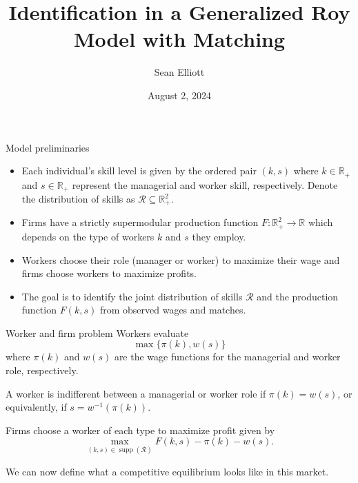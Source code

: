 \documentclass{beamer}
\title[Identification in a Generalized Roy Model with Matching]{Identification in a Generalized Roy Model with Matching}
\date{August 2, 2024}
\author{Sean Elliott}
\institute{University of Toronto}
\DeclareMathOperator\supp{supp}
\begin{document}
	
	
	
%	

	\begin{frame}{Model preliminaries}
		
		\begin{itemize}
			\item Each individual's skill level is given by the ordered pair $(k,s)$ where $k\in\mathbb{R}_+$ and $s\in\mathbb{R}_+$ represent the managerial and worker skill, respectively. Denote the distribution of skills as $\mathcal{R}\subseteq \mathbb{R}^2_+$.
			
			\bigskip
			
			\item Firms have a strictly supermodular production function $F:\mathbb{R}^2_+ \to \mathbb{R}$ which depends on the type of workers $k$ and $s$ they employ.
			
			\bigskip
			
			\item Workers choose their role (manager or worker) to maximize their wage and firms choose workers to maximize profits.
			
			\bigskip
			
			\item The goal is to identify the joint distribution of skills $\mathcal{R}$ and the production function $F(k,s)$ from observed wages and matches.

		\end{itemize}
		

	\end{frame}

	\begin{frame}{Worker and firm problem}
		Workers evaluate 
		\begin{equation*}
			\max\{\pi(k),w(s)\}
		\end{equation*}
		where $\pi(k)$ and $w(s)$ are the wage functions for the managerial and worker role, respectively.

	\bigskip
	
	A worker is indifferent between a managerial or worker role if $\pi(k) = w(s)$, or equivalently, if $s=w^{-1}(\pi(k))$.
	
	\bigskip
	
	Firms choose a worker of each type to maximize profit given by
	\begin{equation*}
		\max_{(k,s)\in\supp(\mathcal{R})} F(k,s) - \pi(k) - w(s).
	\end{equation*}
	
	\bigskip
	
	We can now define what a competitive equilibrium looks like in this market.
	
		\end{frame}
		
\end{document}
